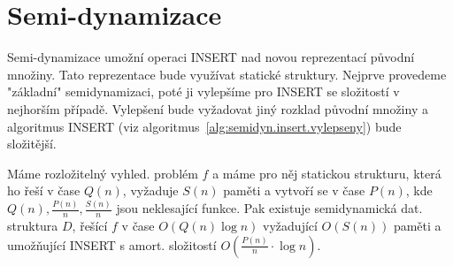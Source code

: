 \section{Semi-dynamizace}

Semi-dynamizace umožní operaci INSERT nad novou reprezentací původní
množiny. Tato reprezentace bude využívat statické struktury. Nejprve
provedeme "základní" semidynamizaci, poté ji vylepšíme pro INSERT se
složitostí v nejhorším případě. Vylepšení bude vyžadovat jiný rozklad
původní množiny a algoritmus INSERT (viz
algoritmus~\ref{alg:semidyn.insert.vylepseny}) 
bude složitější.

\begin{theorem}
Máme rozložitelný vyhled. problém $f$ a máme pro něj statickou strukturu,
která ho řeší v čase $Q(n)$, vyžaduje $S(n)$ paměti a vytvoří se v čase
$P(n)$,
kde $Q(n), \frac{P(n)}{n}, \frac{S(n)}{n}$ jsou neklesající funkce. Pak
existuje semidynamická dat. struktura $D$, řešící $f$ v čase
$O(Q(n)\log n)$ vyžadující $O(S(n))$ paměti a umožňující INSERT s 
amort. složitostí
$O(\frac{P(n)}{n} \cdot\log n)$.
\end{theorem}

